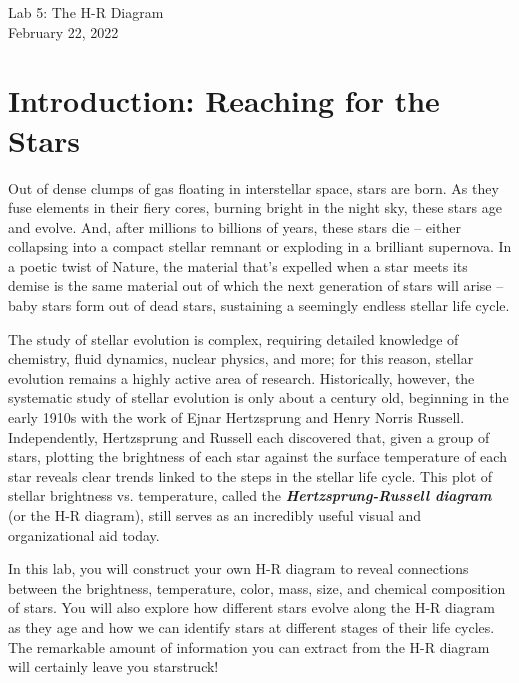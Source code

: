 \documentclass[11pt]{article}
\begin{document}
\begin{center}
\huge{Lab 5: The H-R Diagram}\\ \medskip \Large{February 22, 2022}
\end{center}

\section{Introduction: Reaching for the Stars}

Out of dense clumps of gas floating in interstellar space, stars are born. As they fuse elements in their fiery cores, burning bright in the night sky, these stars age and evolve. And, after millions to billions of years, these stars die -- either collapsing into a compact stellar remnant or exploding in a brilliant supernova. In a poetic twist of Nature, the material that's expelled when a star meets its demise is the same material out of which the next generation of stars will arise -- baby stars form out of dead stars, sustaining a seemingly endless stellar life cycle.  

The study of stellar evolution is complex, requiring detailed knowledge of chemistry, fluid dynamics, nuclear physics, and more; for this reason, stellar evolution remains a highly active area of research. Historically, however, the systematic study of stellar evolution is only about a century old, beginning in the early 1910s with the work of Ejnar Hertzsprung and Henry Norris Russell. Independently, Hertzsprung and Russell each discovered that, given a group of stars, plotting the brightness of each star against the surface temperature of each star reveals clear trends linked to the steps in the stellar life cycle. This plot of stellar brightness vs. temperature, called the \textbf{\emph{Hertzsprung-Russell diagram}} (or the H-R diagram), still serves as an incredibly useful visual and organizational aid today.

In this lab, you will construct your own H-R diagram to reveal connections between the brightness, temperature, color, mass, size, and chemical composition of stars. You will also explore how different stars evolve along the H-R diagram as they age and how we can identify stars at different stages of their life cycles. The remarkable amount of information you can extract from the H-R diagram will certainly leave you starstruck!
\end{document}
